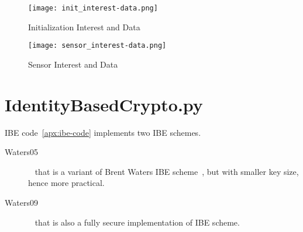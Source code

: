 \begin{figure}[ht]
  \centering
  \texttt{[image: init\_interest-data.png]}
  \caption{Initialization Interest and Data}
  \label{fig:init_interest-data}
\end{figure}

\begin{figure}[ht]
  \centering
  \texttt{[image: sensor\_interest-data.png]}
  \caption{Sensor Interest and Data}
  \label{fig:sensor_interest-data}
\end{figure}

\section{IdentityBasedCrypto.py}
\gls{IBE} code~\autoref{apx:ibe-code} implements two \gls{IBE} schemes.

\begin{description}
  \item[Waters05]~\cite{DBLP:journals/iacr/Naccache05} that is a variant of Brent Waters \gls{IBE} scheme~\cite{DBLP:journals/iacr/Waters04}, but with smaller key size, hence more practical.
  \item[Waters09]~\cite{DBLP:conf/crypto/Waters09} that is also a fully secure implementation of \gls{IBE} scheme.
\end{description}